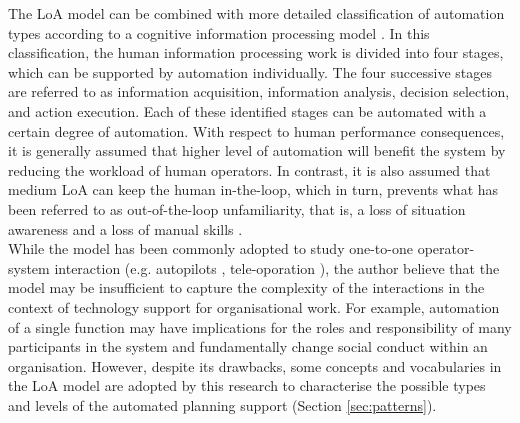 The \ac{LoA} model can be combined with more detailed classification of automation types according to a cognitive information processing model \citep{Parasuraman2000,Manzey2012}. In this classification,  the human information processing work is divided into four stages, which can be supported by automation individually. The four successive stages are referred to as information acquisition, information analysis, decision selection, and action execution. Each of these identified stages can be automated with a certain degree of automation. With respect to human performance consequences, it is generally assumed that higher level of automation will benefit the system by reducing the workload of human operators. In contrast, it is also assumed that medium \ac{LoA} can keep the human in-the-loop, which in turn, prevents what has been referred to as out-of-the-loop unfamiliarity, that is, a loss of situation awareness and a loss of manual skills \citep{Kaber1997,Parasuraman2010}.\\

While the model has been commonly adopted to study one-to-one operator-system interaction (e.g. autopilots \citep{Calhoun2011}, tele-oporation \citep{Schwarz2014}), the author believe that the model may be insufficient to capture the complexity of the interactions in the context of technology support for organisational work. For example, automation of a single function may have implications for the roles and responsibility of many participants in the system and fundamentally change social conduct within an organisation. However, despite its drawbacks, some concepts and vocabularies in the \ac{LoA} model are adopted by this research to characterise the possible types and levels of the automated planning support (Section \ref{sec:patterns}).\\

